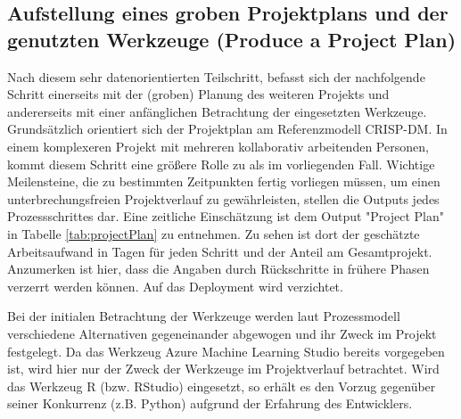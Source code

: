 \subsection{Aufstellung eines groben Projektplans und der genutzten Werkzeuge (Produce a Project Plan)} \label{subsec:projectPlan}
Nach diesem sehr datenorientierten Teilschritt, befasst sich der nachfolgende Schritt einerseits mit der (groben) Planung des weiteren Projekts und andererseits mit einer anfänglichen Betrachtung der eingesetzten Werkzeuge. Grundsätzlich orientiert sich der Projektplan am Referenzmodell CRISP-DM. In einem komplexeren Projekt mit mehreren kollaborativ arbeitenden Personen, kommt diesem Schritt eine größere Rolle zu als im vorliegenden Fall. Wichtige Meilensteine, die zu bestimmten Zeitpunkten fertig vorliegen müssen, um einen unterbrechungsfreien Projektverlauf zu gewährleisten, stellen die Outputs jedes Prozessschrittes dar. Eine zeitliche Einschätzung ist dem Output "Project Plan" in Tabelle \ref{tab:projectPlan} zu entnehmen. Zu sehen ist dort der geschätzte Arbeitsaufwand in Tagen für jeden Schritt und der Anteil am Gesamtprojekt. Anzumerken ist hier, dass die Angaben durch Rückschritte in frühere Phasen verzerrt werden können. Auf das Deployment wird verzichtet.  \par
Bei der initialen Betrachtung der Werkzeuge werden laut Prozessmodell verschiedene Alternativen gegeneinander abgewogen und ihr Zweck im Projekt festgelegt. Da das Werkzeug Azure Machine Learning Studio bereits vorgegeben ist, wird hier nur der Zweck der Werkzeuge im Projektverlauf betrachtet. Wird das Werkzeug R (bzw. RStudio) eingesetzt, so erhält es den Vorzug gegenüber seiner Konkurrenz (z.B. Python) aufgrund der Erfahrung des Entwicklers.


